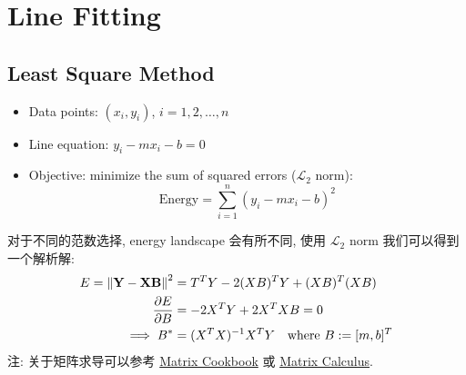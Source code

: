 \section{Line Fitting}
\subsection{Least Square Method}
\begin{itemize}
    \item Data points: $(x_i, y_i)$, $i=1,2,\ldots,n$
    \item Line equation: $y_i - mx_i - b = 0$
    \item Objective: minimize the sum of squared errors ($\mathcal{L}_2$ norm): 
    \[
    \text{Energy} = \sum_{i=1}^{n} (y_i - mx_i - b)^2
    \]
\end{itemize}
对于不同的范数选择, energy landscape 会有所不同, 使用 $\mathcal{L}_2$ norm 我们可以得到一个解析解:
\begin{align*}
    E = \left \Vert  \mathbf{Y} - \mathbf{X} \mathbf{B}  \right \Vert^2 &= T^T Y - 2 (XB)^T Y + (XB)^T (XB) \\
    \frac{\partial E}{\partial B} &= - 2 X^T Y + 2 X^T X B = 0  \\
    \implies B^* &= (X^T X)^{-1} X^T Y \quad \text{where } B := [m, b]^T
\end{align*}
注: 关于矩阵求导可以参考 \href{https://www.math.uwaterloo.ca/~hwolkowi/matrixcookbook.pdf}{Matrix Cookbook} 或 \href{https://ccrma.stanford.edu/~dattorro/matrixcalc.pdf}{Matrix Calculus}.
